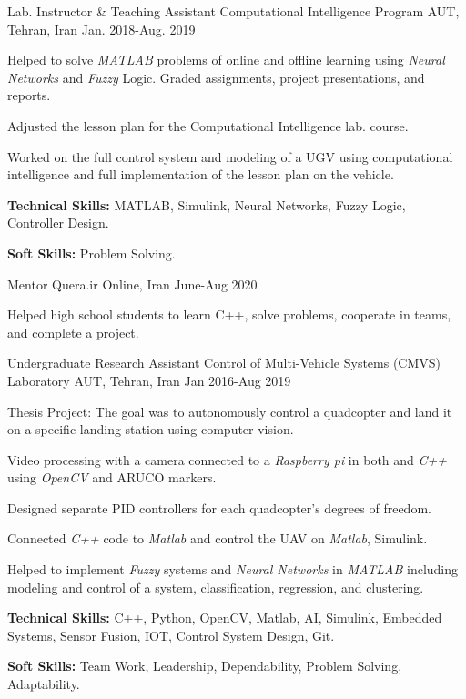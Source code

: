 \begin{cventries}
\cventry
{Lab. Instructor \& Teaching Assistant}
{Computational Intelligence Program}
{AUT, Tehran, Iran}
{Jan. 2018-Aug. 2019}
{
  \begin{cvitems} %
    \item{Helped to solve \textit{MATLAB} problems of online and offline learning using \textit{Neural Networks} and \textit{Fuzzy} Logic. Graded assignments, project presentations, and reports.}
    \item{Adjusted the lesson plan for the Computational Intelligence lab. course.}
    \item{Worked on the full control system and modeling of a UGV using computational intelligence and full implementation of the lesson plan on the vehicle.}
    \item {\textbf{Technical Skills:} MATLAB, Simulink, Neural Networks, Fuzzy Logic, Controller Design.}
\item {\textbf{Soft Skills:} Problem Solving.}
  \end{cvitems}
}

\cventry
{Mentor}
{Quera.ir}
{Online, Iran}
{June-Aug 2020}
{
  \begin{cvitems} %
    \item{Helped high school students to learn C++, solve problems, cooperate in teams, and complete a project.}
  \end{cvitems}
}
 
  \cventry
    {Undergraduate Research Assistant}  %
    {Control of Multi-Vehicle Systems (CMVS) Laboratory} %
    {AUT, Tehran, Iran} %
    {Jan 2016-Aug 2019} %
    {
      \begin{cvitems} %
            \item{Thesis Project: The goal was to autonomously control a quadcopter and land it on a specific landing station using computer vision.}
          \item{Video processing with a camera connected to a \textit{Raspberry pi} in both  and \textit{C++ } using \textit{OpenCV} and ARUCO markers.}
          \item{Designed separate PID controllers for each quadcopter's degrees of freedom.}
          \item{Connected \textit{C++ }code to \textit{Matlab} and control the UAV  on \textit{Matlab}, Simulink.}
          \item {Helped to implement \textit{Fuzzy} systems and \textit{Neural Networks} in \textit{MATLAB} including modeling and control of a system, classification, regression, and clustering.}
        \item {\textbf{Technical Skills:} C++, Python, OpenCV, Matlab, AI, Simulink, Embedded Systems, Sensor Fusion, IOT, Control System Design, Git.}
        \item {\textbf{Soft Skills:} Team Work, Leadership, Dependability, Problem Solving, Adaptability.}
      \end{cvitems}
    }   
 

\end{cventries}
